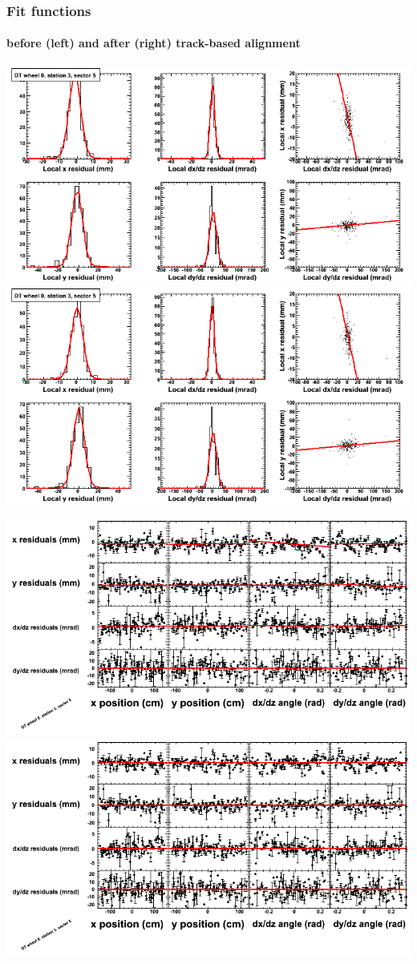 \documentclass[compress]{beamer}
\begin{document}
\begin{frame}
\frametitle{Fit functions}
\framesubtitle{before (left) and after (right) track-based alignment}
\includegraphics[width=0.5\linewidth]{fitfunctions_re01/MBwhCst3sec05_bellcurves.png} \includegraphics[width=0.5\linewidth]{fitfunctions_re05/MBwhCst3sec05_bellcurves.png}

\includegraphics[width=0.5\linewidth]{fitfunctions_re01/MBwhCst3sec05_polynomials.png} \includegraphics[width=0.5\linewidth]{fitfunctions_re05/MBwhCst3sec05_polynomials.png}
\end{frame}
\end{document}
